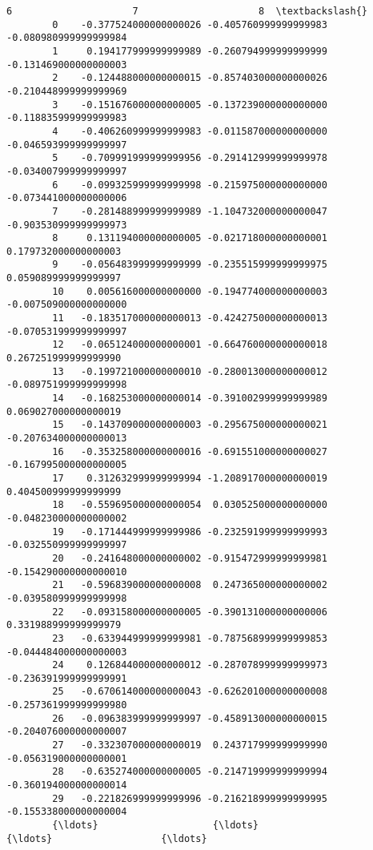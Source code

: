 \documentclass[11pt]{article}
\begin{document}
\begin{Verbatim}[commandchars=\\\{\}]
                                 6                     7                     8  \textbackslash{}
        0    -0.377524000000000026 -0.405760999999999983 -0.080980999999999984   
        1     0.194177999999999989 -0.260794999999999999 -0.131469000000000003   
        2    -0.124488000000000015 -0.857403000000000026 -0.210448999999999969   
        3    -0.151676000000000005 -0.137239000000000000 -0.118835999999999983   
        4    -0.406260999999999983 -0.011587000000000000 -0.046593999999999997   
        5    -0.709991999999999956 -0.291412999999999978 -0.034007999999999997   
        6    -0.099325999999999998 -0.215975000000000000 -0.073441000000000006   
        7    -0.281488999999999989 -1.104732000000000047 -0.903530999999999973   
        8     0.131194000000000005 -0.021718000000000001  0.179732000000000003   
        9    -0.056483999999999999 -0.235515999999999975  0.059089999999999997   
        10    0.005616000000000000 -0.194774000000000003 -0.007509000000000000   
        11   -0.183517000000000013 -0.424275000000000013 -0.070531999999999997   
        12   -0.065124000000000001 -0.664760000000000018  0.267251999999999990   
        13   -0.199721000000000010 -0.280013000000000012 -0.089751999999999998   
        14   -0.168253000000000014 -0.391002999999999989  0.069027000000000019   
        15   -0.143709000000000003 -0.295675000000000021 -0.207634000000000013   
        16   -0.353258000000000016 -0.691551000000000027 -0.167995000000000005   
        17    0.312632999999999994 -1.208917000000000019  0.404500999999999999   
        18   -0.559695000000000054  0.030525000000000000 -0.048230000000000002   
        19   -0.171444999999999986 -0.232591999999999993 -0.032550999999999997   
        20   -0.241648000000000002 -0.915472999999999981 -0.154290000000000010   
        21   -0.596839000000000008  0.247365000000000002 -0.039580999999999998   
        22   -0.093158000000000005 -0.390131000000000006  0.331988999999999979   
        23   -0.633944999999999981 -0.787568999999999853 -0.044484000000000003   
        24    0.126844000000000012 -0.287078999999999973 -0.236391999999999991   
        25   -0.670614000000000043 -0.626201000000000008 -0.257361999999999980   
        26   -0.096383999999999997 -0.458913000000000015 -0.204076000000000007   
        27   -0.332307000000000019  0.243717999999999990 -0.056319000000000001   
        28   -0.635274000000000005 -0.214719999999999994 -0.360194000000000014   
        29   -0.221826999999999996 -0.216218999999999995 -0.155338000000000004   
        {\ldots}                    {\ldots}                   {\ldots}                   {\ldots}   

\end{Verbatim}
\end{document}
